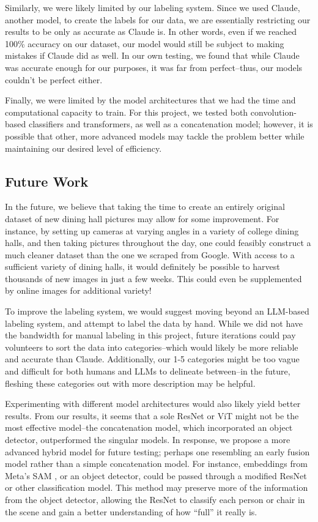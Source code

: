 \documentclass{article}
\begin{document}
\begin{multicols}{2}
Similarly, we were likely limited by our labeling system. Since we used Claude, another model, to create the labels for our data, we are essentially restricting our results to be only as accurate as Claude is. In other words, even if we reached 100\% accuracy on our dataset, our model would still be subject to making mistakes if Claude did as well. In our own testing, we found that while Claude was accurate enough for our purposes, it was far from perfect–thus, our models couldn’t be perfect either.

Finally, we were limited by the model architectures that we had the time and computational capacity to train. For this project, we tested both convolution-based classifiers and transformers, as well as a concatenation model; however, it is possible that other, more advanced models may tackle the problem better while maintaining our desired level of efficiency.

\subsection*{Future Work}
In the future, we believe that taking the time to create an entirely original dataset of new dining hall pictures may allow for some improvement. For instance, by setting up cameras at varying angles in a variety of college dining halls, and then taking pictures throughout the day, one could feasibly construct a much cleaner dataset than the one we scraped from Google. With access to a sufficient variety of dining halls, it would definitely be possible to harvest thousands of new images in just a few weeks. This could even be supplemented by online images for additional variety!

To improve the labeling system, we would suggest moving beyond an LLM-based labeling system, and attempt to label the data by hand. While we did not have the bandwidth for manual labeling in this project, future iterations could pay volunteers to sort the data into categories–which would likely be more reliable and accurate than Claude. Additionally, our 1-5 categories might be too vague and difficult for both humans and LLMs to delineate between–in the future, fleshing these categories out with more description may be helpful. 

Experimenting with different model architectures would also likely yield better results. From our results, it seems that a sole ResNet or ViT might not be the most effective model–the concatenation model, which incorporated an object detector, outperformed the singular models. In response, we propose a more advanced hybrid model for future testing; perhaps one resembling an early fusion model rather than a simple concatenation model. For instance, embeddings from Meta’s SAM \cite{kirillovSegmentAnything2023}, or an object detector, could be passed through a modified ResNet or other classification model. This method may preserve more of the information from the object detector, allowing the ResNet to classify each person or chair in the scene and gain a better understanding of how “full” it really is.


\end{multicols}
\end{document}
